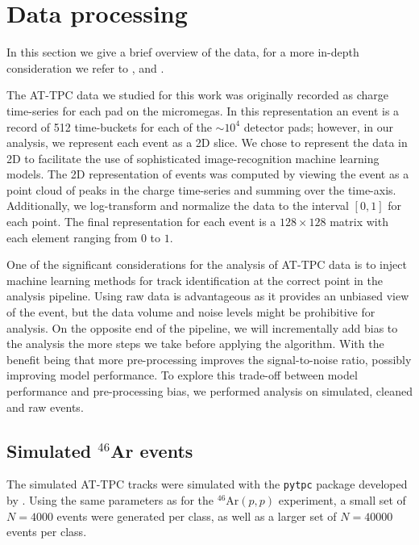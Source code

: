 \documentclass[preprint,12pt]{elsarticle}
\begin{document}
\section{Data processing}

In this section we give a brief overview of the data, for a more in-depth consideration we refer to \cite{Mittig2015}, \cite{Suzuki2012} and  \cite{Bradt2017a}. 

The AT-TPC data we studied for this work was originally recorded as charge time-series for each pad on the micromegas.
In this representation an event is a record of 512 time-buckets for each of the $\sim10^4$ detector pads; however, in our analysis, we represent each event as a 2D slice.
We chose to represent the data in 2D to facilitate the use of sophisticated image-recognition machine learning models.
The 2D representation of events was computed by viewing the event as a point cloud of peaks in the charge time-series and summing over the time-axis.
Additionally, we log-transform and normalize the data to  the interval $[0, 1]$ for each point. The final representation for each event is a $128 \times 128$ matrix with each element ranging from $0$ to $1$.

One of the significant considerations for the analysis of AT-TPC data is to inject machine learning methods for track identification at the correct point in the analysis pipeline.
Using raw data is advantageous as it provides an unbiased view of the event, but the data volume and noise levels might be prohibitive for analysis.
On the opposite end of the pipeline, we will incrementally add bias to the analysis the more steps we take before applying the algorithm. With the benefit being that more pre-processing improves the signal-to-noise ratio, possibly improving model performance.
To explore this trade-off between model performance and pre-processing bias, we performed analysis on simulated, cleaned and raw events.

\subsection{Simulated \texorpdfstring{${}^{46}$Ar}{46Ar}  events}\label{sec:data_sim}

The simulated AT-TPC tracks were simulated with the \lstinline{pytpc} package developed by \citet{Bradt2017a}. Using the same parameters as for the ${}^{46}$Ar$(p, p)$ experiment, a small set of $N=4000$ events were generated per class, as well as a larger set of $N=40000$ events per class. 
\end{document}
